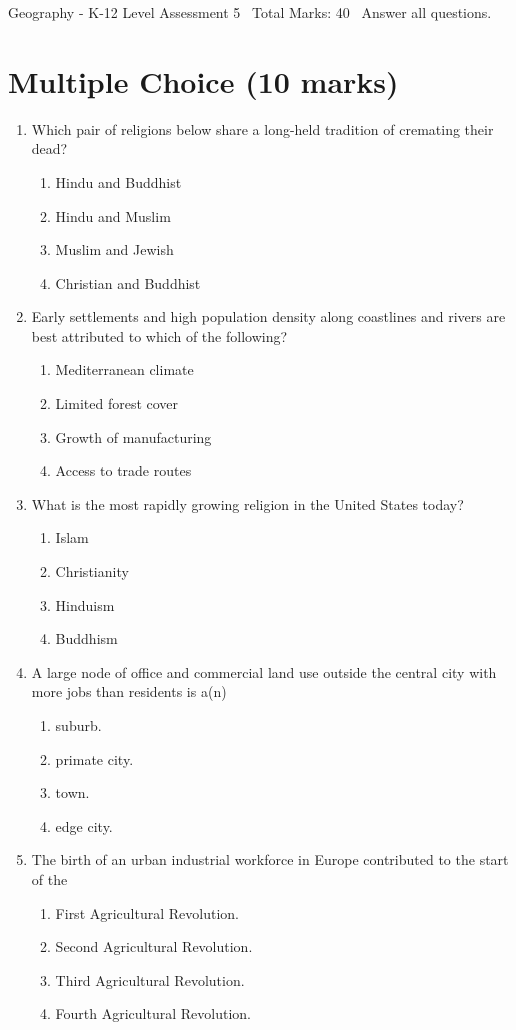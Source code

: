 \documentclass[12pt]{article}
\begin{document}
\begin{center}
Geography - K-12 Level Assessment 5 \
Total Marks: 40 \
Answer all questions.
\end{center}

\section*{Multiple Choice (10 marks)}
\begin{enumerate}[label=\arabic*.]
\item Which pair of religions below share a long-held tradition of cremating their dead?
\begin{enumerate}[label=(\alph*)]
    \item Hindu and Buddhist
    \item Hindu and Muslim
    \item Muslim and Jewish
    \item Christian and Buddhist
\end{enumerate}
\item Early settlements and high population density along coastlines and rivers are best
attributed to which of the following?
\begin{enumerate}[label=(\alph*)]
    \item Mediterranean climate
    \item Limited forest cover
    \item Growth of manufacturing
    \item Access to trade routes
\end{enumerate}
\item What is the most rapidly growing religion in the United States today?
\begin{enumerate}[label=(\alph*)]
    \item Islam
    \item Christianity
    \item Hinduism
    \item Buddhism
\end{enumerate}
\item A large node of office and commercial land use outside the central city with more jobs
than residents is a(n)
\begin{enumerate}[label=(\alph*)]
    \item suburb.
    \item primate city.
    \item town.
    \item edge city.
\end{enumerate}
\item The birth of an urban industrial workforce in Europe contributed to the start of the
\begin{enumerate}[label=(\alph*)]
    \item First Agricultural Revolution.
    \item Second Agricultural Revolution.
    \item Third Agricultural Revolution.
    \item Fourth Agricultural Revolution.
\end{enumerate}
\end{enumerate}
\end{document}
